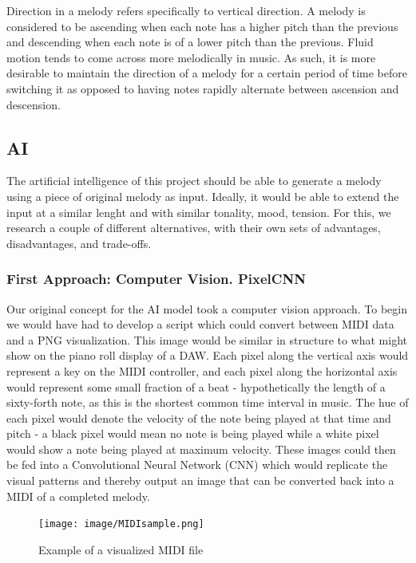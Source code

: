 Direction in a melody refers specifically to vertical direction. A melody is considered to be
ascending when each note has a higher pitch than the previous and descending when each note is of a
lower pitch than the previous. Fluid motion tends to come across more melodically in music. As
such, it is more desirable to maintain the direction of a melody for a certain period of time
before switching it as opposed to having notes rapidly alternate between ascension and descension.\autocite{contour}

\subsection{AI}

The artificial intelligence of this project should be able to generate a melody using
a piece of original melody as input. Ideally, it would be able to extend the input at a
similar lenght and with similar tonality, mood, tension. For this, we research
a couple of different alternatives, with their own sets of advantages, disadvantages, and
trade-offs.

\subsubsection{First Approach: Computer Vision. PixelCNN}

Our original concept for the AI model took a computer vision approach. To begin we would
have had to develop a script which could convert between MIDI data and a PNG
visualization. This image would be similar in structure to what might show on the piano
roll display of a DAW. Each pixel along the vertical axis would represent a key on the
MIDI controller, and each pixel along the horizontal axis would represent some small
fraction of a beat - hypothetically the length of a sixty-forth note, as this is the
shortest common time interval in music. The hue of each pixel would denote the velocity
of the note being played at that time and pitch - a black pixel would mean no note is
being played while a white pixel would show a note being played at maximum velocity.
These images could then be fed into a Convolutional Neural Network (CNN) which would
replicate the visual patterns and thereby output an image that can be converted back into
a MIDI of a completed melody.

\begin{figure}[h!]
  \centering
  \texttt{[image: image/MIDIsample.png]}
  \caption{Example of a visualized MIDI file}
  \label{fig:midi_sample}
\end{figure}


